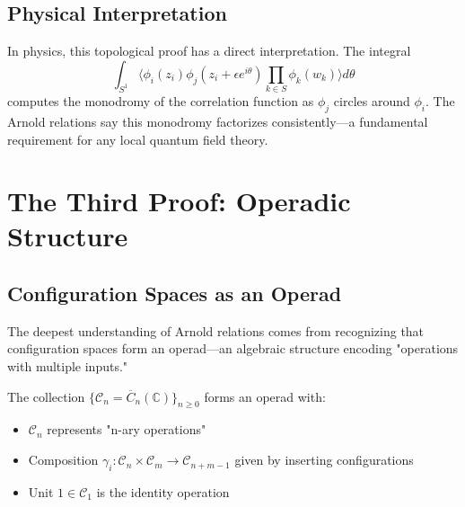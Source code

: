 \subsection{Physical Interpretation}

In physics, this topological proof has a direct interpretation. The integral
$$\int_{S^1} \langle \phi_i(z_i) \phi_j(z_i + \epsilon e^{i\theta}) \prod_{k \in S} \phi_k(w_k) \rangle d\theta$$
computes the monodromy of the correlation function as $\phi_j$ circles around $\phi_i$. The Arnold relations say this monodromy factorizes consistently—a fundamental requirement for any local quantum field theory.

\section{The Third Proof: Operadic Structure}

\subsection{Configuration Spaces as an Operad}

The deepest understanding of Arnold relations comes from recognizing that configuration spaces form an operad—an algebraic structure encoding "operations with multiple inputs."

\begin{definition}
The collection $\{\mathcal{C}_n = \overline{C}_n(\mathbb{C})\}_{n \geq 0}$ forms an operad with:
\begin{itemize}
\item $\mathcal{C}_n$ represents "n-ary operations"
\item Composition $\gamma_i: \mathcal{C}_n \times \mathcal{C}_m \to \mathcal{C}_{n+m-1}$ given by inserting configurations
\item Unit $1 \in \mathcal{C}_1$ is the identity operation
\end{itemize}
\end{definition}

